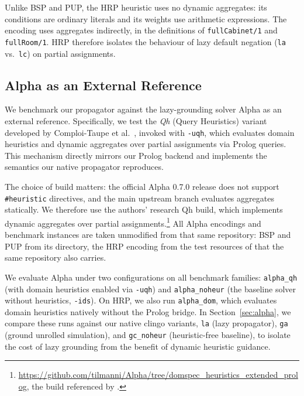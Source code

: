Unlike BSP and PUP, the HRP heuristic uses no dynamic aggregates: its conditions are ordinary literals and its weights use arithmetic expressions. The encoding uses aggregates indirectly, in the definitions of \texttt{fullCabinet/1} and \texttt{fullRoom/1}. HRP therefore isolates the behaviour of lazy default negation (\texttt{la} vs.\ \texttt{lc}) on partial assignments.

\subsection{Alpha as an External Reference}
\label{sec:alpha-setup}

We benchmark our propagator against the lazy-grounding solver Alpha \cite{weinzierl2017blending,comploi2023domain} as an external reference. Specifically, we test the \emph{Qh} (Query Heuristics) variant developed by Comploi-Taupe et al.~\cite{comploi2023dynamicAggregates}, invoked with \texttt{-uqh}, which evaluates domain heuristics and dynamic aggregates over partial assignments via Prolog queries. This mechanism directly mirrors our Prolog backend and implements the semantics our native propagator reproduces.

The choice of build matters: the official Alpha 0.7.0 release does not support \texttt{\#heuristic} directives, and the main upstream branch evaluates aggregates statically. We therefore use the authors' research Qh build, which implements dynamic aggregates over partial assignments.\footnote{\url{https://github.com/tilmanni/Alpha/tree/domspec_heuristics_extended_prolog}, the build referenced by \cite{comploi2023dynamicAggregates}.} All Alpha encodings and benchmark instances are taken unmodified from that same repository: BSP and PUP from its  directory, the HRP encoding from the test resources of \cite{comploi2023domain} that the same repository also carries.

We evaluate Alpha under two configurations on all benchmark families: \texttt{alpha\_qh} (with domain heuristics enabled via \texttt{-uqh}) and \texttt{alpha\_noheur} (the baseline solver without heuristics, \texttt{-ids}). On HRP, we also run \texttt{alpha\_dom}, which evaluates domain heuristics natively without the Prolog bridge. In Section~\ref{sec:alpha}, we compare these runs against our native clingo variants, \texttt{la} (lazy propagator), \texttt{ga} (ground unrolled simulation), and \texttt{gc\_noheur} (heuristic-free baseline), to isolate the cost of lazy grounding from the benefit of dynamic heuristic guidance.

